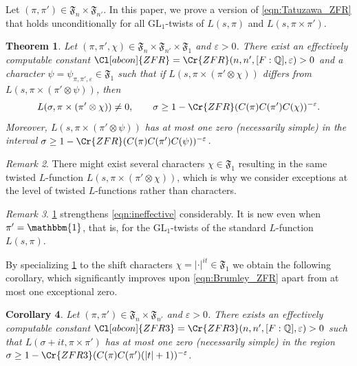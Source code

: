 \documentclass[12pt]{amsart}
\newtheorem{theorem}{Theorem}[section]
\newtheorem{corollary}[theorem]{Corollary}
\theoremstyle{definition}
\theoremstyle{remark}
\newtheorem{remark}[theorem]{Remark}
\numberwithin{equation}{section}
\theoremstyle{plain}
\renewcommand{\epsilon}{\varepsilon}
\newcommand{\GL}{\mathrm{GL}}
\newcommand{\Q}{\mathbb{Q}}
\begin{document}
Let $(\pi,\pi')\in\mathfrak{F}_n\times\mathfrak{F}_{n'}$.  In this paper, we prove a version of \eqref{eqn:Tatuzawa_ZFR} that holds unconditionally for all $\GL_1$-twists of $L(s,\pi)$ and $L(s,\pi\times\pi')$.

\begin{theorem}
\label{thm:Tatuzawa}
Let $(\pi,\pi',\chi)\in\mathfrak{F}_n\times\mathfrak{F}_{n'}\times\mathfrak{F}_1$ and $\epsilon>0$. There exist an effectively computable constant $\Cl[abcon]{ZFR}=\Cr{ZFR}(n,n',[F:\Q],\epsilon)>0$ and a character $\psi=\psi_{\pi,\pi',\epsilon}\in\mathfrak{F}_1$ such that if $L(s,\pi\times(\pi'\otimes\chi))$ differs from $L(s,\pi\times(\pi'\otimes\psi))$, then
\begin{equation}
\label{ZFRfinal}
L(\sigma,\pi\times(\pi'\otimes\chi))\neq 0,\qquad \sigma\geq 1-\Cr{ZFR}(C(\pi)C(\pi')C(\chi))^{-\epsilon}.
\end{equation}
Moreover, $L(s,\pi\times(\pi'\otimes\psi))$ has at most one zero (necessarily simple) in the interval $\sigma\geq 1-\Cr{ZFR}(C(\pi)C(\pi')C(\psi))^{-\epsilon}$.
\end{theorem}

\begin{remark}
There might exist several characters $\chi\in\mathfrak{F}_1$ resulting in the same twisted $L$-function $L(s,\pi\times(\pi'\otimes\chi))$, which is why we consider exceptions at the level of twisted $L$-functions rather than characters.
\end{remark}

\begin{remark}
\cref{thm:Tatuzawa} strengthens \eqref{eqn:ineffective} considerably.  It is new even when $\pi'=\mathbbm{1}$, that is, for the $\GL_1$-twists of the standard $L$-function $L(s,\pi)$.
\end{remark}

By specializing \cref{thm:Tatuzawa} to the shift characters $\chi=|\cdot|^{it}\in\mathfrak{F}_1$ we obtain the following corollary, which significantly improves upon \eqref{eqn:Brumley_ZFR} apart from at most one exceptional zero.

\begin{corollary}
\label{cor:Tatuzawa}
Let $(\pi,\pi')\in\mathfrak{F}_n\times\mathfrak{F}_{n'}$ and $\epsilon>0$. There exists an effectively computable constant $\Cl[abcon]{ZFR3}=\Cr{ZFR3}(n,n',[F:\Q],\epsilon)>0$ such that $L(\sigma+it,\pi\times\pi')$ has at most one zero (necessarily simple) in the region $\sigma\geq 1-\Cr{ZFR3}(C(\pi)C(\pi')(|t|+1))^{-\epsilon}$.
\end{corollary}
\end{document}

